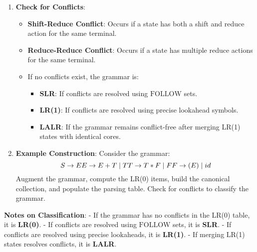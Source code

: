 \begin{enumerate}
  \item \textbf{Check for Conflicts}:
  \begin{itemize}
    \item \textbf{Shift-Reduce Conflict}: Occurs if a state has both a shift and reduce action for the same terminal.
    \item \textbf{Reduce-Reduce Conflict}: Occurs if a state has multiple reduce actions for the same terminal.
    \item If no conflicts exist, the grammar is:
    \begin{itemize}
      \item \textbf{SLR}: If conflicts are resolved using \(\text{FOLLOW}\) sets.
      \item \textbf{LR(1)}: If conflicts are resolved using precise lookahead symbols.
      \item \textbf{LALR}: If the grammar remains conflict-free after merging LR(1) states with identical cores.
    \end{itemize}
  \end{itemize}

  \item \textbf{Example Construction}:
  Consider the grammar:
  \[
  S \to E \\
  E \to E + T \mid T \\
  T \to T * F \mid F \\
  F \to (E) \mid id
  \]
  Augment the grammar, compute the LR(0) items, build the canonical collection, and populate the parsing table. Check for conflicts to classify the grammar.

\end{enumerate}

\textbf{Notes on Classification}:
- If the grammar has no conflicts in the LR(0) table, it is \textbf{LR(0)}.
- If conflicts are resolved using \(\text{FOLLOW}\) sets, it is \textbf{SLR}.
- If conflicts are resolved using precise lookaheads, it is \textbf{LR(1)}.
- If merging LR(1) states resolves conflicts, it is \textbf{LALR}.